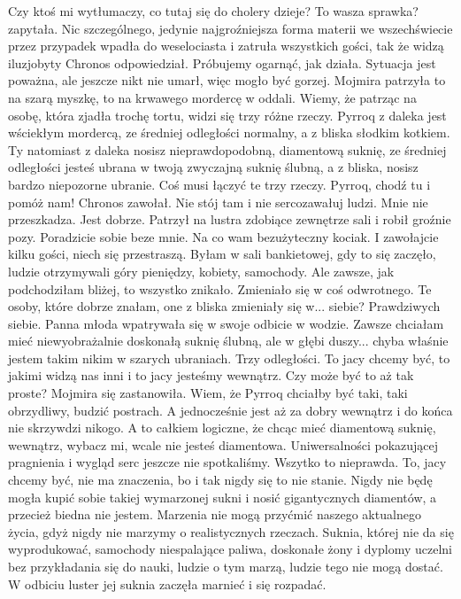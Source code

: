 \begin{dialogue}
\ds{} Czy ktoś mi wytłumaczy, co tutaj się do cholery dzieje? To wasza sprawka? \dm{} zapytała.
\ds{} Nic szczególnego, jedynie najgroźniejsza forma materii we wszechświecie przez przypadek wpadła do weselociasta i zatruła wszystkich gości, tak że widzą iluzjobyty \dm{}
Chronos odpowiedział.
\ds{} Próbujemy ogarnąć, jak działa. Sytuacja jest poważna, ale jeszcze nikt nie umarł, więc mogło być gorzej. \dm{} 
Mojmira patrzyła to na szarą myszkę, to na krwawego mordercę w oddali. \dm{}
Wiemy, że patrząc na osobę, która zjadła trochę tortu, widzi się trzy różne rzeczy. 
Pyrroq z daleka jest wściekłym mordercą, ze średniej odległości normalny, a z bliska słodkim kotkiem.
Ty natomiast z daleka nosisz nieprawdopodobną, diamentową suknię, ze średniej odległości jesteś ubrana w twoją zwyczajną suknię ślubną, a z bliska, nosisz bardzo niepozorne ubranie.
Coś musi łączyć te trzy rzeczy.
\ds{} Pyrroq, chodź tu i pomóż nam! \dm{} Chronos zawołał. \dm{} Nie stój tam i nie sercozawałuj ludzi.
\ds{} Mnie nie przeszkadza. Jest dobrze. \dm{} Patrzył na lustra zdobiące zewnętrze sali i robił groźnie pozy. \dm{}
Poradzicie sobie beze mnie. Na co wam bezużyteczny kociak. I zawołajcie kilku gości, niech się przestraszą.
\ds{} Byłam w sali bankietowej, gdy to się zaczęło, ludzie otrzymywali góry pieniędzy, kobiety, samochody. Ale zawsze, jak podchodziłam bliżej, to wszystko znikało.
Zmieniało się w coś odwrotnego. Te osoby, które dobrze znałam, one z bliska zmieniały się w... siebie? 
Prawdziwych siebie. \dm{} Panna młoda wpatrywała się w swoje odbicie w wodzie.
\dm{} Zawsze chciałam mieć niewyobrażalnie doskonałą suknię ślubną, ale w głębi duszy... chyba właśnie jestem takim nikim w szarych ubraniach.
Trzy odległości. To jacy chcemy być, to jakimi widzą nas inni i to jacy jesteśmy wewnątrz.
\ds{} Czy może być to aż tak proste? \dm{} Mojmira się zastanowiła. \dm{} Wiem, że Pyrroq chciałby być taki, taki obrzydliwy, budzić postrach. 
A jednocześnie jest aż za dobry wewnątrz i do końca nie skrzywdzi nikogo. 
A to całkiem logiczne, że chcąc mieć diamentową suknię, wewnątrz, wybacz mi, wcale nie jesteś diamentowa.
Uniwersalności pokazującej pragnienia i wygląd serc jeszcze nie spotkaliśmy.
\ds{} Wszytko to nieprawda. To, jacy chcemy być, nie ma znaczenia, bo i tak nigdy się to nie stanie.
Nigdy nie będę mogła kupić sobie takiej wymarzonej sukni i nosić gigantycznych diamentów, a przecież biedna nie jestem. 
Marzenia nie mogą przyćmić naszego aktualnego życia, gdyż nigdy nie marzymy o realistycznych rzeczach.
Suknia, której nie da się wyprodukować, samochody niespalające paliwa, doskonałe żony i dyplomy uczelni bez przykładania się do nauki, ludzie o tym marzą, 
ludzie tego nie mogą dostać. \dm{} 
W odbiciu luster jej suknia zaczęła marnieć i się rozpadać.


\end{dialogue}
